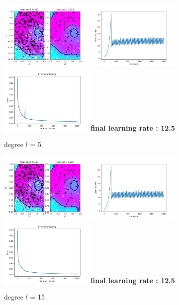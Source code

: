 \documentclass[a4paper]{article}
\begin{document}
\begin{figure}[h]
	\includegraphics[width=0.4\textwidth]{logreg_deg5_iter2000.png}
	\includegraphics[width=0.4\textwidth]{logreg_deg5_iter2000_learn.png}
	\includegraphics[width=0.4\textwidth]{logreg_deg5_iter2000_error.png}
	\textbf{final learning rate : 12.5}
	\caption{degree $l$ = 5}
\end{figure}
\begin{figure}[h]
	\includegraphics[width=0.4\textwidth]{logreg_deg15_iter2000.png}
	\includegraphics[width=0.4\textwidth]{logreg_deg15_iter2000_learn.png}
	\includegraphics[width=0.4\textwidth]{logreg_deg15_iter2000_error.png}
	\textbf{final learning rate : 12.5}
	\caption{degree $l$ = 15}
\end{figure}
\clearpage
\end{document}

